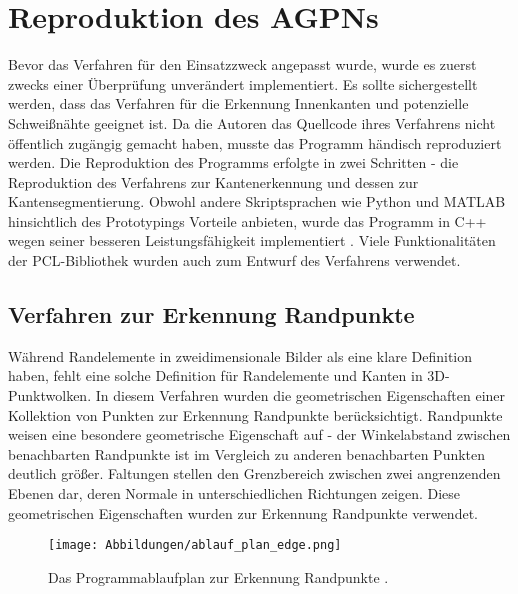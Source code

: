 \section{Reproduktion des AGPNs}
Bevor das Verfahren für den Einsatzzweck angepasst wurde, wurde es zuerst zwecks einer Überprüfung unverändert implementiert. Es sollte sichergestellt werden, dass das Verfahren für die Erkennung Innenkanten und potenzielle Schweißnähte geeignet ist. Da die Autoren das Quellcode ihres Verfahrens nicht öffentlich zugängig gemacht haben, musste das Programm händisch reproduziert werden. Die Reproduktion des Programms erfolgte in zwei Schritten - die Reproduktion des Verfahrens zur Kantenerkennung und dessen zur Kantensegmentierung. Obwohl andere Skriptsprachen wie Python und MATLAB hinsichtlich des Prototypings Vorteile anbieten, wurde das Programm in C++ wegen seiner besseren Leistungsfähigkeit implementiert \autocite{svensson_performance_2021}. Viele Funktionalitäten der PCL-Bibliothek \autocite{rusu_3d_2011} wurden auch zum Entwurf des Verfahrens verwendet.

\subsection{Verfahren zur Erkennung Randpunkte} \label{edge_detection_reprod}
Während Randelemente in zweidimensionale Bilder als eine klare Definition haben, fehlt eine solche Definition für Randelemente und Kanten in 3D-Punktwolken. In diesem Verfahren wurden die geometrischen Eigenschaften einer Kollektion von Punkten zur Erkennung Randpunkte berücksichtigt. Randpunkte weisen eine besondere geometrische Eigenschaft auf - der Winkelabstand zwischen benachbarten Randpunkte ist im Vergleich zu anderen benachbarten Punkten deutlich größer. Faltungen stellen den Grenzbereich zwischen zwei angrenzenden Ebenen dar, deren Normale in unterschiedlichen Richtungen zeigen. Diese geometrischen Eigenschaften wurden zur Erkennung Randpunkte verwendet. \autocite[1-2]{ni_edge_2016}

\begin{figure}[h]
	\texttt{[image: Abbildungen/ablauf\_plan\_edge.png]}
	\centering
	\caption{Das Programmablaufplan zur Erkennung Randpunkte \autocite{ni_edge_2016}.}
	\label{flow_chart}
\end{figure}

